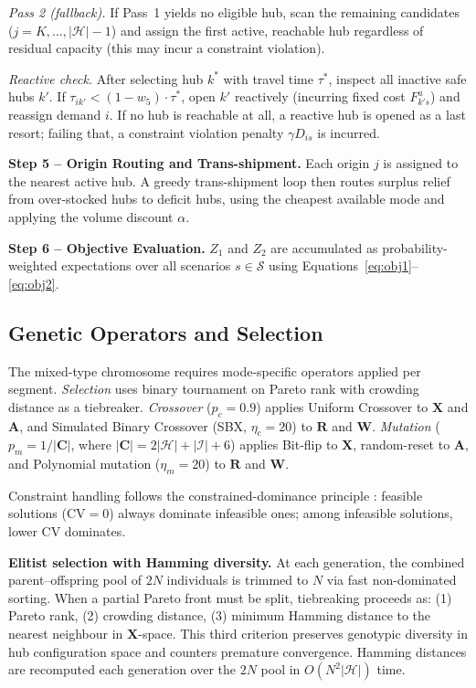 \documentclass{llncs}
\begin{document}
{\textit{Pass 2 (fallback).} If Pass~1 yields no eligible hub, scan the remaining candidates ($j = K, \ldots, |\mathcal{H}|-1$) and assign the first active, reachable hub regardless of residual capacity (this may incur a constraint violation).

\textit{Reactive check.} After selecting hub $k^*$ with travel time $\tau^*$, inspect all inactive safe hubs $k'$. If $\tau_{ik'} < (1 - w_5) \cdot \tau^*$, open $k'$ reactively (incurring fixed cost $F^a_{k's}$) and reassign demand $i$. If no hub is reachable at all, a reactive hub is opened as a last resort; failing that, a constraint violation penalty $\gamma D_{is}$ is incurred.

\textbf{Step 5 -- Origin Routing and Trans-shipment.} Each origin $j$ is assigned to the nearest active hub. A greedy trans-shipment loop then routes surplus relief from over-stocked hubs to deficit hubs, using the cheapest available mode and applying the volume discount $\alpha$.

\textbf{Step 6 -- Objective Evaluation.} $Z_1$ and $Z_2$ are accumulated as probability-weighted expectations over all scenarios $s \in \mathcal{S}$ using Equations~\eqref{eq:obj1}--\eqref{eq:obj2}.

\subsection{Genetic Operators and Selection}

The mixed-type chromosome requires mode-specific operators applied per segment. \emph{Selection} uses binary tournament on Pareto rank with crowding distance as a tiebreaker. \emph{Crossover} ($p_c = 0.9$) applies Uniform Crossover to $\mathbf{X}$ and $\mathbf{A}$, and Simulated Binary Crossover (SBX, $\eta_c = 20$) to $\mathbf{R}$ and $\mathbf{W}$. \emph{Mutation} ($p_m = 1/|\mathbf{C}|$, where $|\mathbf{C}| = 2|\mathcal{H}| + |\mathcal{I}| + 6$) applies Bit-flip to $\mathbf{X}$, random-reset to $\mathbf{A}$, and Polynomial mutation ($\eta_m = 20$) to $\mathbf{R}$ and $\mathbf{W}$.

Constraint handling follows the constrained-dominance principle \cite{deb2002fast}: feasible solutions ($\text{CV} = 0$) always dominate infeasible ones; among infeasible solutions, lower CV dominates.

\textbf{Elitist selection with Hamming diversity.} At each generation, the combined parent--offspring pool of $2N$ individuals is trimmed to $N$ via fast non-dominated sorting. When a partial Pareto front must be split, tiebreaking proceeds as: (1) Pareto rank, (2) crowding distance, (3) minimum Hamming distance to the nearest neighbour in $\mathbf{X}$-space. This third criterion preserves genotypic diversity in hub configuration space and counters premature convergence. Hamming distances are recomputed each generation over the $2N$ pool in $O(N^2 |\mathcal{H}|)$ time.
}
\end{document}
